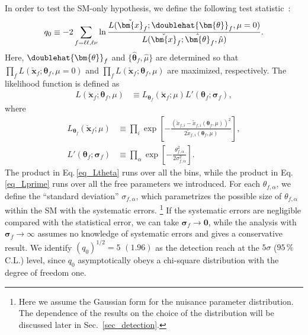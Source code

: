 \documentclass[12pt,twoside,book]{article}
\begin{document}
In order to test the SM-only hypothesis, we define the following test statistic~\cite{Cowan:2010js}:
\begin{align}
  q_0 \equiv -2 \sum_{f=\ell \ell, \ell \nu} \ln \frac
  {L(\check{\bm{x}}_f ; \doublehat{\bm{\theta}}_f, \mu=0)}
  {L(\check{\bm{x}}_f ; \hat{\bm{\theta}}_f, \hat{\mu})}.
  \label{eq_q0}
\end{align}
Here, $\doublehat{\bm{\theta}}_f$ and $\{ \hat{\bm{\theta}}_f, \hat{\mu} \}$ are determined so that $\prod_f L(\check{\bm{x}}_f ; \bm{\theta}_f, \mu=0)$ and $\prod_f L(\check{\bm{x}}_f ; \bm{\theta}_f, \mu)$ are maximized, respectively.
The likelihood function is defined as
\begin{align}
  L(\check{\bm{x}}_f ; \bm{\theta}_f, \mu) &\equiv
  L_{\bm{\theta}_f} (\check{\bm{x}}_f ; \mu) L'(\bm{\theta}_f ; \bm{\sigma}_f),
  \label{eq_L}
\end{align}
where
\begin{align}
  L_{\bm{\theta}_f} (\check{\bm{x}}_f ; \mu) &\equiv
  \prod_{i} \exp \left[
  -\frac{(\check{x}_{f,i} - \tilde{x}_{f,i} (\bm{\theta}_f, \mu))^2}
  {2 \tilde{x}_{f,i} (\bm{\theta}_f, \mu)}
  \right],
  \label{eq_Ltheta}\\
  L'(\bm{\theta}_f ; \bm{\sigma}_f) &\equiv
  \prod_{\alpha} \exp \left[
  - \frac{\theta_{f,\alpha}^2}{2\sigma_{f,\alpha}^2}
  \right].
  \label{eq_Lprime}
\end{align}
The product in Eq.\,\eqref{eq_Ltheta} runs over all the bins, while the product in Eq.\,\eqref{eq_Lprime} runs over all the free parameters we introduced.
For each $\theta_{f, \alpha}$, we define the ``standard deviation'' $\sigma_{f, \alpha}$, which parametrizes the possible size of $\theta_{f, \alpha}$ within the SM with the
systematic errors.
\footnote{
  Here we assume the Gaussian form for the nuisance parameter distribution.  The dependence of the results on the choice of the distribution will be discussed later in Sec.~\ref{sec_detection}.
}
If the systematic errors are negligible compared with the statistical error, we can take $\bm{\sigma}_f \to \bm{0}$, while the analysis with $\bm{\sigma}_f \to \infty$ assumes no knowledge of systematic errors and gives a conservative result.
We identify $( q_0 )^{1/2} = 5$ $(1.96)$ as the detection reach at the $5\sigma$ ($95\,\%$ C.L.) level, since $q_0$ asymptotically obeys a chi-square distribution with the degree of freedom one.
\end{document}
